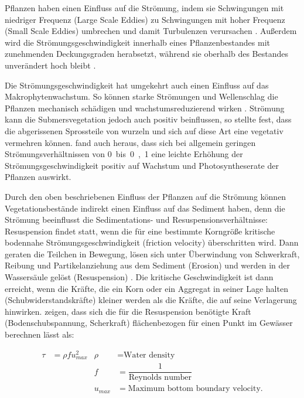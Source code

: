 Pflanzen haben einen Einfluss auf die Strömung, indem sie Schwingungen mit niedriger Frequenz (Large Scale Eddies) zu Schwingungen mit hoher Frequenz (Small Scale Eddies) umbrechen und damit Turbulenzen verursachen \citep{leonard_2006}. Außerdem wird die Strömungsgeschwindigkeit innerhalb eines Pflanzenbestandes mit zunehmenden Deckungsgraden herabsetzt, während sie oberhalb des Bestandes unverändert hoch bleibt \citep{li_2014}.

Die Strömungsgeschwindigkeit hat umgekehrt auch einen Einfluss auf das Makrophytenwachstum. So können starke Strömungen und Wellenschlag die Pflanzen mechanisch schädigen und wachstumsreduzierend wirken \citep{biggs_1996}. Strömung kann die Submersvegetation jedoch auch positiv beinflussen, so stellte \citep{madsen_1997} fest, dass die abgerissenen Sprossteile von  wurzeln und sich auf diese Art eine vegetativ vermehren können. \cite{madsen_1983} fand auch heraus,  dass sich bei allgemein geringen Strömungsverhältnissen von \unit{0 bis 0,1}{\metre\per\second} eine leichte Erhöhung der Strömungsgeschwindigkeit  positiv auf Wachstum und Photosyntheserate der Pflanzen auswirkt.

Durch den oben beschriebenen Einfluss der Pflanzen auf die Strömung können Vegetationsbestände indirekt einen Einfluss auf das Sediment haben, denn die Strömung beeinflusst die Sedimentations- und Resuspensionsverhältnisse: 
Resuspension findet statt, wenn die für eine bestimmte Korngröße kritische bodennahe Strömungsgeschwindigkeit (friction velocity) überschritten wird. Dann geraten die Teilchen in Bewegung, lösen sich unter Überwindung von Schwerkraft, Reibung und Partikelanziehung aus dem Sediment (Erosion) und werden in der Wassersäule gelöst (Resuspension) \citep{madsen_2001, hartge_1991}. Die kritische Geschwindigkeit ist dann erreicht, wenn die Kräfte, die ein Korn oder ein Aggregat in seiner Lage halten (Schubwiderstandskräfte) kleiner werden als die Kräfte, die auf seine Verlagerung hinwirken. \cite{laenen_1996} zeigen, dass sich die für die Resuspension benötigte Kraft (Bodenschubspannung, Scherkraft) flächenbezogen für einen Punkt im Gewässer berechnen lässt als:

\begin{align*}
\tau &= \rho f u_{max}^{2} & \rho &=\text{Water density}\\ 
     &     				   &  f   &= \dfrac{1}{\text{Reynolds number}}\\
     &					   & u_{max} &= \text{Maximum bottom boundary velocity}.
\end{align*}


